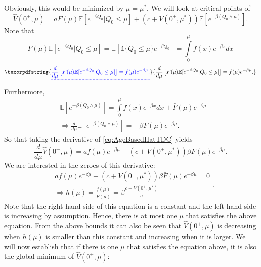 \documentclass[a4paper]{thesis}
\theoremstyle{definition}
\providecommand{\DIFaddtex}[1]{{\protect\color{blue}\uwave{#1}}} %
\providecommand{\DIFaddbegin}{} %
\providecommand{\DIFaddend}{} %
\providecommand{\DIFdelbegin}{} %
\providecommand{\DIFdelend}{} %
\providecommand{\DIFadd}[1]{\texorpdfstring{\DIFaddtex{#1}}{#1}} %
\newcommand{\DIFscaledelfig}{0.5}
\newlength{\DIFdelgraphicswidth} %
\newlength{\DIFdelgraphicsheight} %
\newcommand{\DIFaddincludegraphics}[2][]{{\color{blue}\fbox{\DIFOincludegraphics[#1]{#2}}}} %
\newcommand{\DIFdelincludegraphics}[2][]{%
	\sbox{\DIFdelgraphicsbox}{\DIFOincludegraphics[#1]{#2}}%
	\settoboxwidth{\DIFdelgraphicswidth}{\DIFdelgraphicsbox} %
	\settoboxtotalheight{\DIFdelgraphicsheight}{\DIFdelgraphicsbox} %
	\scalebox{\DIFscaledelfig}{%
		\parbox[b]{\DIFdelgraphicswidth}{\usebox{\DIFdelgraphicsbox}\\[-\baselineskip] \rule{\DIFdelgraphicswidth}{0em}}\llap{\resizebox{\DIFdelgraphicswidth}{\DIFdelgraphicsheight}{%
				\setlength{\unitlength}{\DIFdelgraphicswidth}%
				\begin{picture}(1,1)%
				\thicklines\linethickness{2pt} %
				{\color[rgb]{1,0,0}\put(0,0){\framebox(1,1){}}}%
				{\color[rgb]{1,0,0}\put(0,0){\line( 1,1){1}}}%
				{\color[rgb]{1,0,0}\put(0,1){\line(1,-1){1}}}%
				\end{picture}%
			}\hspace*{3pt}}} %
} %
\DeclareRobustCommand{\DIFaddbegin}{\DIFOaddbegin \let\includegraphics\DIFaddincludegraphics} %
\DeclareRobustCommand{\DIFaddend}{\DIFOaddend \let\includegraphics\DIFOincludegraphics} %
\DeclareRobustCommand{\DIFdelbegin}{\DIFOdelbegin \let\includegraphics\DIFdelincludegraphics} %
\DeclareRobustCommand{\DIFdelend}{\DIFOaddend \let\includegraphics\DIFOincludegraphics} %
\begin{document}
	Obviously, this would be minimized by $\mu=\mu^*$.
	We will look at critical points of
	\begin{equation}\label{eq:AgeBasedHatTDC}
	\hat{V}(0^+,\mu)=aF(\mu)\mathbb{E}[e^{-\beta Q_0}|Q_0\leq \mu]+(c+V(0^+,\mu^*))\mathbb{E}[e^{-\beta(Q_0\wedge\mu)}].
	\end{equation}
	Note that 
	\[
	\DIFdelbegin %
	\DIFdelend \DIFaddbegin F(\mu)\mathbb{E}[e^{-\beta Q_0}|Q_0\leq \mu]=\mathbb{E}[\mathds{1}\{Q_0\leq \mu\}e^{-\beta Q_0}]=\int\limits_0^\mu f(x)e^{-\beta x}dx
	 \]
	\DIFaddbegin \DIFadd{So that
	}\[
	\DIFadd{\frac{d}{d\mu}\left[F(\mu)\mathbb{E}[e^{-\beta Q_0}|Q_0\leq \mu]\right]=f(\mu)e^{-\beta \mu}.
	}\]
	\DIFaddend Furthermore,
	\[
	\begin{split}
	&\mathbb{E}[e^{-\beta(Q_0\wedge\mu)}]=\int\limits_0^\mu f(x)e^{-\beta x}dx+\bar{F}(\mu)e^{-\beta\mu}\\
	&\Rightarrow \frac{d}{d\mu}\mathbb{E}[e^{-\beta(Q_0\wedge\mu)}]=-\beta\bar{F}(\mu)e^{-\beta\mu}.
	\end{split}
	\]
	So that taking the derivative of \eqref{eq:AgeBasedHatTDC} yields
	\[\frac{d}{d\mu}\hat{V}(0^+,\mu)=af(\mu)e^{-\beta\mu}-(c+V(0^+,\mu^*))\beta\bar{F}(\mu)e^{-\beta\mu}.\]
	We are interested in the zeroes of this derivative:
	\[
	\begin{split}
	&af(\mu)e^{-\beta\mu}-(c+V(0^+,\mu^*))\beta\bar{F}(\mu)e^{-\beta\mu}=0\\
	&\Rightarrow h(\mu)=\frac{f(\mu)}{\bar{F}(\mu)}=\beta\frac{c+V(0^+,\mu^*)}{a}
	\end{split}
	.\]
	Note that the right hand side of this equation is a constant and the left hand side is increasing by assumption.
	Hence, there is at most one $\mu$ that satisfies the above equation.
	From the above bounds it can also be seen that $\hat{V}(0^+,\mu)$ is decreasing when $h(\mu)$ is smaller than this constant and increasing when it is larger.
	We will now establish that if there is one $\mu$ that satisfies the equation above, it is also the global minimum of $\hat{V}(0^+,\mu)$:
\end{document}
